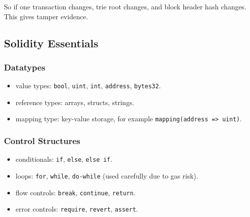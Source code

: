 \documentclass[12pt,a4paper]{article}
\begin{document}
So if one transaction changes, trie root changes, and block header hash changes.
This gives tamper evidence.

\begin{center}
\end{center}

\subsection{Solidity Essentials}

\subsubsection*{Datatypes}
\begin{itemize}
\item value types: \texttt{bool}, \texttt{uint}, \texttt{int}, \texttt{address}, \texttt{bytes32}.
\item reference types: arrays, structs, strings.
\item mapping type: key-value storage, for example \texttt{mapping(address => uint)}.
\end{itemize}

\subsubsection*{Control Structures}
\begin{itemize}
\item conditionals: \texttt{if}, \texttt{else}, \texttt{else if}.
\item loops: \texttt{for}, \texttt{while}, \texttt{do-while} (used carefully due to gas risk).
\item flow controls: \texttt{break}, \texttt{continue}, \texttt{return}.
\item error controls: \texttt{require}, \texttt{revert}, \texttt{assert}.
\end{itemize}
\end{document}
